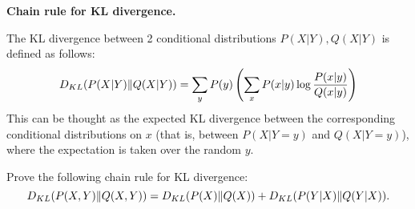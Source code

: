 \item {} \textbf{Chain rule for KL divergence.}

The KL divergence between 2
conditional distributions $P(X|Y),Q(X|Y)$ is defined as follows:
\[
D_{KL}(P(X|Y)\|Q(X|Y))
= \sum_y P(y) \left(\sum_x P(x|y)\log\frac{P(x|y)}{Q(x|y)}\right)
\]
This can be thought as the expected KL divergence between the
corresponding conditional distributions on $x$ (that is, between
$P(X|Y=y)$ and $Q(X|Y=y)$), where the expectation is taken over the
random $y$.

Prove the following chain rule for KL divergence:
$$ D_{KL}(P(X,Y)\|Q(X,Y)) = D_{KL}(P(X)\|Q(X)) + D_{KL}(P(Y|X)\|Q(Y|X)). $$
